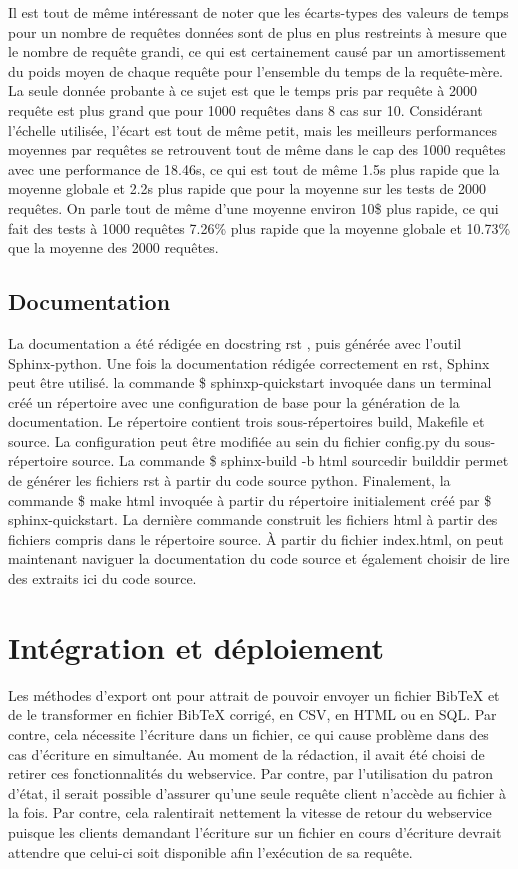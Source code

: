 \documentclass[12pt,titlepage]{article}
\let\oldsection\section
\renewcommand\section{\clearpage\oldsection}
\begin{document}
Il est tout de même intéressant de noter que les écarts-types des valeurs de temps pour un nombre de requêtes données sont de plus en plus restreints à mesure que le nombre de requête grandi, ce qui est certainement causé par un amortissement du poids moyen de chaque requête pour l'ensemble du temps de la requête-mère. La seule donnée probante à ce sujet est que le temps pris par requête à 2000 requête est plus grand que pour 1000 requêtes dans 8 cas sur 10. Considérant l'échelle utilisée, l'écart est tout de même petit, mais les meilleurs performances moyennes par requêtes se retrouvent tout de même dans le cap des 1000 requêtes avec une performance de 18.46s, ce qui est tout de même 1.5s plus rapide que la moyenne globale et 2.2s plus rapide que pour la moyenne sur les tests de 2000 requêtes. On parle tout de même d'une moyenne environ 10\$ plus rapide, ce qui fait des tests à 1000 requêtes 7.26\% plus rapide que la moyenne globale et 10.73\% que la moyenne des 2000 requêtes.

\subsection{Documentation}
La documentation a été rédigée en docstring rst \cite{PDGa}, puis générée avec l'outil Sphinx-python. Une fois la documentation rédigée correctement en rst, Sphinx peut être utilisé. la commande \$ sphinxp-quickstart invoquée dans un terminal créé un répertoire avec une configuration de base pour la génération de la documentation. Le répertoire contient trois sous-répertoires build, Makefile et source. La configuration peut être modifiée au sein du fichier config.py du sous-répertoire source. La commande \$ sphinx-build -b html sourcedir builddir permet de générer les fichiers rst à partir du code source python. Finalement, la commande \$ make html invoquée à partir du répertoire initialement créé par \$ sphinx-quickstart. La dernière commande construit les fichiers html à partir des fichiers compris dans le répertoire source. À partir du fichier index.html, on peut maintenant naviguer la documentation du code source et également choisir de lire des extraits ici du code source. 



\section{Intégration et déploiement}


Les méthodes d'export ont pour attrait de pouvoir envoyer un fichier BibTeX et de le transformer en fichier BibTeX corrigé, en CSV, en HTML ou en SQL. Par contre, cela nécessite l'écriture dans un fichier, ce qui cause problème dans des cas d'écriture en simultanée. Au moment de la rédaction, il avait été choisi de retirer ces fonctionnalités du webservice. Par contre, par l'utilisation du patron d'état, il serait possible d'assurer qu'une seule requête client n'accède au fichier à la fois. Par contre, cela ralentirait nettement la vitesse de retour du webservice puisque les clients demandant l'écriture sur un fichier en cours d'écriture devrait attendre que celui-ci soit disponible afin l'exécution de sa requête.\newline
\end{document}
